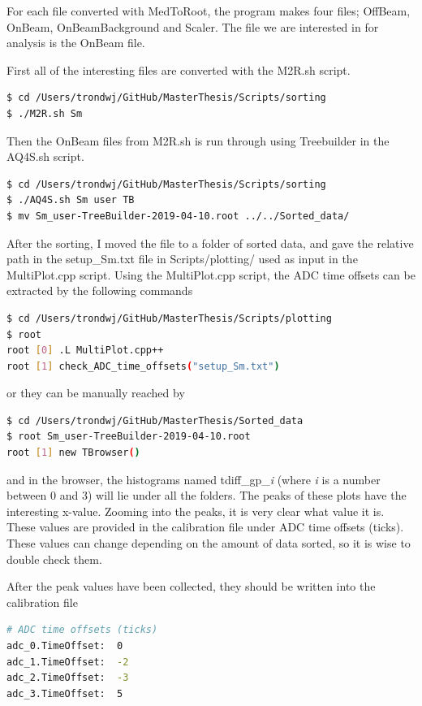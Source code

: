 \documentclass[twoside,english]{uiofysmaster/uiofysmaster}
\begin{document}
For each file converted with MedToRoot, the program makes four files; OffBeam, OnBeam, OnBeamBackground and Scaler. The file we are interested in for analysis is the OnBeam file. 

First all of the interesting files are converted with the M2R.sh script. 
\begin{lstlisting}[language=sh]
$ cd /Users/trondwj/GitHub/MasterThesis/Scripts/sorting 
$ ./M2R.sh Sm
\end{lstlisting}

Then the OnBeam files from M2R.sh is run through using Treebuilder in the AQ4S.sh script. 

\begin{lstlisting}[language=sh]
$ cd /Users/trondwj/GitHub/MasterThesis/Scripts/sorting 
$ ./AQ4S.sh Sm user TB
$ mv Sm_user-TreeBuilder-2019-04-10.root ../../Sorted_data/
\end{lstlisting}


After the sorting, I moved the file to a folder of sorted data, and gave the relative path in the setup\_Sm.txt file in Scripts/plotting/ used as input in the MultiPlot.cpp script. 
Using the MultiPlot.cpp script, the ADC time offsets can be extracted by the following commands
\begin{lstlisting}[language=sh]
$ cd /Users/trondwj/GitHub/MasterThesis/Scripts/plotting
$ root
root [0] .L MultiPlot.cpp++
root [1] check_ADC_time_offsets("setup_Sm.txt")
\end{lstlisting}
or they can be manually reached by
\begin{lstlisting}[language=sh]
$ cd /Users/trondwj/GitHub/MasterThesis/Sorted_data
$ root Sm_user-TreeBuilder-2019-04-10.root
root [1] new TBrowser()
\end{lstlisting}
and in the browser, the histograms named tdiff\_gp\_\textit{i} (where \textit{i} is a number between 0 and 3) will lie under all the folders. The peaks of these plots have the interesting x-value. Zooming into the peaks, it is very clear what value it is. These values are provided in the calibration file under ADC time offsets (ticks). These values can change depending on the amount of data sorted, so it is wise to double check them.

After the peak values have been collected, they should be written into the calibration file
\begin{lstlisting}[language=sh]
# ADC time offsets (ticks)
adc_0.TimeOffset:  0
adc_1.TimeOffset:  -2
adc_2.TimeOffset:  -3
adc_3.TimeOffset:  5
\end{lstlisting}
\end{document}
